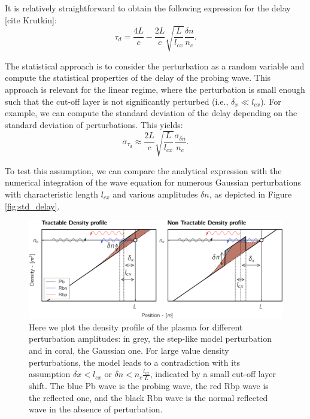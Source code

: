 \documentclass[11pt,openany]{report}
\begin{document}
\begin{multicols}{2}
    It is relatively straightforward to obtain the following expression for the delay [cite Krutkin]:
    $$\tau_d = \frac{4L}{c} - \frac{2L}{c} \sqrt{\frac{L}{l_{cx}}} \frac{\delta n}{n_c}.$$

    The statistical approach is to consider the perturbation as a random variable and compute the statistical properties of the delay of the probing wave. This approach is relevant for the linear regime, where the perturbation is small enough such that the cut-off layer is not significantly perturbed (i.e., $\delta_x \ll l_{cx}$). For example, we can compute the standard deviation of the delay depending on the standard deviation of perturbations. This yields:
    $$\sigma_{\tau_d} \approx \frac{2L}{c} \sqrt{\frac{L}{l_{cx}}} \frac{\sigma_{\delta n}}{n_c}.$$

    To test this assumption, we can compare the analytical expression with the numerical integration of the wave equation for numerous Gaussian perturbations with characteristic length $l_{cx}$ and various amplitudes $\delta n$, as depicted in Figure \ref{fig:std_delay}.
\end{multicols}
\noindent

\begin{figure}[H]
    \centering
    \hspace*{-0.8cm}\includegraphics[width = 1.03\linewidth]{./figures/density_profile.png}
    \caption{Here we plot the density profile of the plasma for different perturbation amplitudes: in grey, the step-like model perturbation and in coral, the Gaussian one. For large value density perturbations, the model leads to a contradiction with its assumption \(\delta x < l_{cx}\) or \(\delta n < n_c \frac{l_{cx}}{L}\), indicated by a small cut-off layer shift. The blue Pb wave is the probing wave, the red Rbp wave is the reflected one, and the black Rbn wave is the normal reflected wave in the absence of perturbation.}
    \label{Density_profile}
\end{figure}
\end{document}
